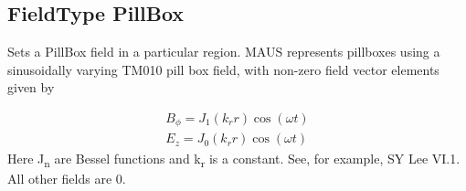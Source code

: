 \subsection{FieldType PillBox}
Sets a PillBox field in a particular region. MAUS represents pillboxes using a sinusoidally varying TM010 pill box
field, with non-zero field vector elements given by

\begin{equation*}
\begin{gathered}B_{\phi }=J_1(k_rr)\cos (\omega t)\\E_z=J_0(k_rr)\cos (\omega t)\end{gathered}
\end{equation*}
Here J\textsubscript{n} are Bessel functions and k\textsubscript{r} is a constant. See, for example, SY Lee VI.1. All
other fields are 0.

